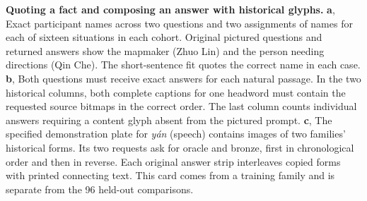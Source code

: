 \textbf{Quoting a fact and composing an answer with historical glyphs.}
\textbf{a}, Exact participant names across two questions and two assignments of names for each of sixteen situations in each cohort. Original pictured questions and returned answers show the mapmaker (Zhuo Lin) and the person needing directions (Qin Che). The short-sentence fit quotes the correct name in each case.
\textbf{b}, Both questions must receive exact answers for each natural passage. In the two historical columns, both complete captions for one headword must contain the requested source bitmaps in the correct order. The last column counts individual answers requiring a content glyph absent from the pictured prompt.
\textbf{c}, The specified demonstration plate for \textit{yán} (speech) contains images of two families' historical forms. Its two requests ask for oracle and bronze, first in chronological order and then in reverse. Each original answer strip interleaves copied forms with printed connecting text. This card comes from a training family and is separate from the 96 held-out comparisons.
